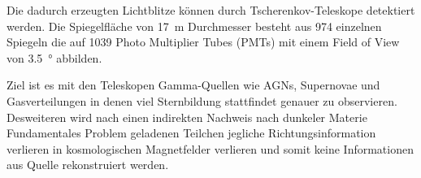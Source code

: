 Die dadurch erzeugten Lichtblitze können durch Tscherenkov-Teleskope detektiert
werden.
Die Spiegelfläche von \SI{17}{\meter} Durchmesser besteht aus \num{974} einzelnen
Spiegeln die auf \num{1039} Photo Multiplier Tubes (PMTs) mit einem
Field of View von \SI{3.5}{\degree} abbilden. 

Ziel ist es mit den Teleskopen Gamma-Quellen wie AGNs, Supernovae und
Gasverteilungen in denen viel Sternbildung stattfindet genauer zu observieren. 
Desweiteren wird nach einen indirekten Nachweis nach dunkeler Materie 
Fundamentales Problem geladenen Teilchen jegliche Richtungsinformation verlieren
in kosmologischen Magnetfelder verlieren und somit keine Informationen aus
Quelle rekonstruiert werden. 

\clearpage
